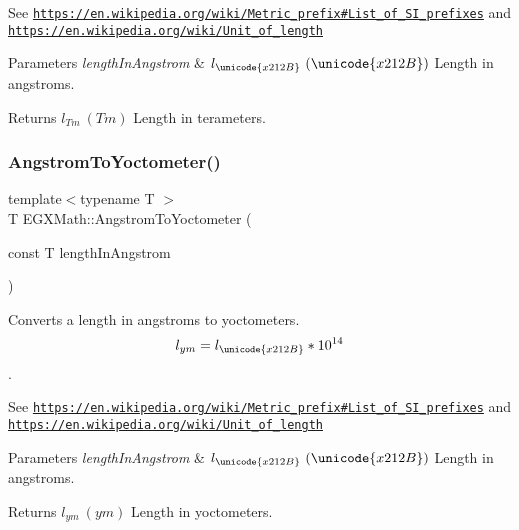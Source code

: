 See \href{https://en.wikipedia.org/wiki/Metric_prefix#List_of_SI_prefixes}{\tt https\+://en.\+wikipedia.\+org/wiki/\+Metric\+\_\+prefix\#\+List\+\_\+of\+\_\+\+S\+I\+\_\+prefixes} and \href{https://en.wikipedia.org/wiki/Unit_of_length}{\tt https\+://en.\+wikipedia.\+org/wiki/\+Unit\+\_\+of\+\_\+length} 
\begin{DoxyParams}{Parameters}
{\em length\+In\+Angstrom} & $ l_{\unicode{x212B}}\ (\unicode{x212B})$ Length in angstroms. \\
\hline
\end{DoxyParams}
\begin{DoxyReturn}{Returns}
$ l_{Tm}\ (Tm)$ Length in terameters. 
\end{DoxyReturn}
\mbox{\label{group___e_g_x_math-_conversions-_length_conversions-_non-_s_i-_angstrom-_s_i_ga3e889736a84a54f24aa20e218527521d}} 
\subsubsection{\texorpdfstring{Angstrom\+To\+Yoctometer()}{AngstromToYoctometer()}}
{\footnotesize\ttfamily template$<$typename T $>$ \\
T E\+G\+X\+Math\+::\+Angstrom\+To\+Yoctometer (\begin{DoxyParamCaption}\item[{const T}]{length\+In\+Angstrom }\end{DoxyParamCaption})}



Converts a length in angstroms to yoctometers. \[ l_{ym}=l_{\unicode{x212B}} * 10^{14} \]. 

See \href{https://en.wikipedia.org/wiki/Metric_prefix#List_of_SI_prefixes}{\tt https\+://en.\+wikipedia.\+org/wiki/\+Metric\+\_\+prefix\#\+List\+\_\+of\+\_\+\+S\+I\+\_\+prefixes} and \href{https://en.wikipedia.org/wiki/Unit_of_length}{\tt https\+://en.\+wikipedia.\+org/wiki/\+Unit\+\_\+of\+\_\+length} 
\begin{DoxyParams}{Parameters}
{\em length\+In\+Angstrom} & $ l_{\unicode{x212B}}\ (\unicode{x212B})$ Length in angstroms. \\
\hline
\end{DoxyParams}
\begin{DoxyReturn}{Returns}
$ l_{ym}\ (ym)$ Length in yoctometers. 
\end{DoxyReturn}
\mbox{\label{group___e_g_x_math-_conversions-_length_conversions-_non-_s_i-_angstrom-_s_i_gae57ab83be8b18be2436ced646312c17f}} 
